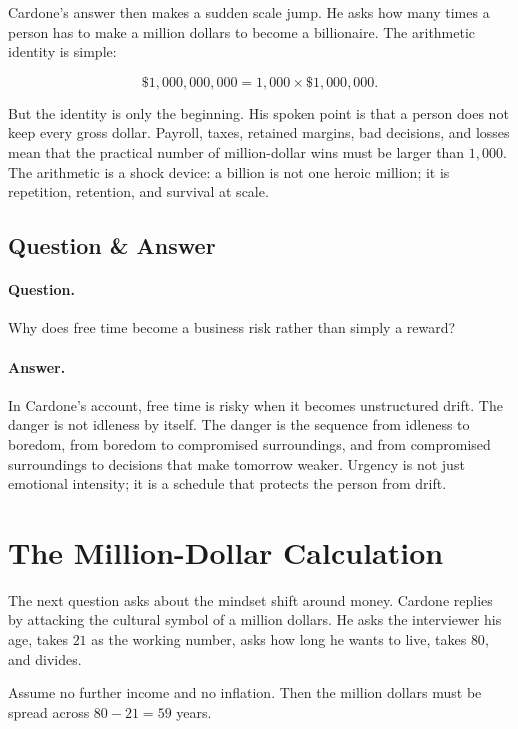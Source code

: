 Cardone's answer then makes a sudden scale jump. He asks how many times a person has to make a million dollars to become a billionaire. The arithmetic identity is simple:

\begin{equation}
\$1{,}000{,}000{,}000
=
1{,}000\times \$1{,}000{,}000.
\end{equation}

But the identity is only the beginning. His spoken point is that a person does not keep every gross dollar. Payroll, taxes, retained margins, bad decisions, and losses mean that the practical number of million-dollar wins must be larger than \(1{,}000\). The arithmetic is a shock device: a billion is not one heroic million; it is repetition, retention, and survival at scale.

\subsection{Question \& Answer}

\paragraph{Question.} Why does free time become a business risk rather than simply a reward?

\paragraph{Answer.} In Cardone's account, free time is risky when it becomes unstructured drift. The danger is not idleness by itself. The danger is the sequence from idleness to boredom, from boredom to compromised surroundings, and from compromised surroundings to decisions that make tomorrow weaker. Urgency is not just emotional intensity; it is a schedule that protects the person from drift.

\section{The Million-Dollar Calculation}

The next question asks about the mindset shift around money. Cardone replies by attacking the cultural symbol of a million dollars. He asks the interviewer his age, takes \(21\) as the working number, asks how long he wants to live, takes \(80\), and divides.

Assume no further income and no inflation. Then the million dollars must be spread across \(80-21=59\) years.

